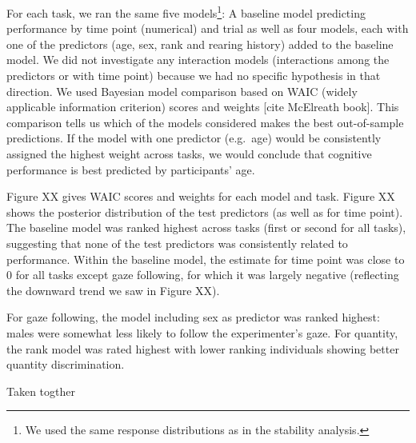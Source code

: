 \documentclass[10pt, letterpaper]{article}
\begin{document}
For each task, we ran the same five models\footnote{We used the same
  response distributions as in the stability analysis.}: A baseline
model predicting performance by time point (numerical) and trial as well
as four models, each with one of the predictors (age, sex, rank and
rearing history) added to the baseline model. We did not investigate any
interaction models (interactions among the predictors or with time
point) because we had no specific hypothesis in that direction. We used
Bayesian model comparison based on WAIC (widely applicable information
criterion) scores and weights {[}cite McElreath book{]}. This comparison
tells us which of the models considered makes the best out-of-sample
predictions. If the model with one predictor (e.g.~age) would be
consistently assigned the highest weight across tasks, we would conclude
that cognitive performance is best predicted by participants' age.

Figure XX gives WAIC scores and weights for each model and task. Figure
XX shows the posterior distribution of the test predictors (as well as
for time point). The baseline model was ranked highest across tasks
(first or second for all tasks), suggesting that none of the test
predictors was consistently related to performance. Within the baseline
model, the estimate for time point was close to 0 for all tasks except
gaze following, for which it was largely negative (reflecting the
downward trend we saw in Figure XX).

For gaze following, the model including sex as predictor was ranked
highest: males were somewhat less likely to follow the experimenter's
gaze. For quantity, the rank model was rated highest with lower ranking
individuals showing better quantity discrimination.

Taken togther
\end{document}
